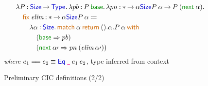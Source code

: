 \documentclass{article}
\newcommand{\meta}[1]{\mathsf{\textcolor{metacolour}{#1}}}
\newcommand{\ind}[1]{\mathsf{\textcolor{indcolour}{#1}}}
\newcommand{\constr}[1]{\mathsf{\textcolor{constrcolour}{#1}}}
\newcommand{\kw}[1]{\mathsf{\textcolor{kwcolour}{#1}}}
\newcommand{\kwopen}[1]{\kw{#1}\:}
\newcommand{\kwbin}[1]{\:\kw{#1}\:}
\newcommand{\pr}[1]{\raisebox{-#1pt}{$^\prime$}}
\newcommand{\alphapr}{\alpha\pr{3}}
\newcommand{\arr}[2]{#1 \mathbin{\rightarrow} #2}
\newcommand{\lam}[3]{\lambda #1 \mathbin{:} #2 \mathpunct{.} #3}
\newcommand{\app}[2]{#1 \: #2}
\newcommand{\Type}[1]{\ind{Type}_{#1}}
\newcommand{\match}[3]{\kwopen{match} #1 \kwbin{return} #2 \kwbin{with} #3}
\newcommand{\fix}[3]{\kwopen{fix} #1 \mathbin{:} #2 \mathbin{\coloneqq} \phantom{} #3}
\newcommand{\Size}{\ind{Size}}
\newcommand{\base}{\constr{base}}
\newcommand{\next}{\constr{next}}
\newcommand{\Eq}{\ind{Eq}}
\newcommand{\eq}[2]{#1 \mathrel{=\joinrel=} #2}
\newcommand{\any}{\meta{\texttt{\_}}}
\begin{document}
\begin{figure}[h]
\begin{align*}
{        }&\quad\lam{P}{\arr{\Size}{\Type{}}}{\lam{pb}{\app{P}{\base}}{\lam{pn}{\arr*{\alpha}{\Size}{\arr{\app{P}{\alpha}}{\app{P}{(\app{\next}{\alpha})}}}}{ \\
        &\qquad\fix{\textit{elim}}{\arr*{\alpha}{\Size}{\app{P}{\alpha}}}{ \\
        &\quad\qquad \lam{\alpha}{\Size}{\match{\alpha}{().\alpha.\app{P}{\alpha}}{ \\
        &\qquad\qquad (\base \Rightarrow pb) \\
        &\qquad\qquad (\app{\next}{\alphapr} \Rightarrow \app{pn}{(\app{\textit{elim}}{\alphapr})})}}}}}}
    \end{align*}
    \textit{where} $\eq{e_1}{e_2} \equiv \app{\app{\app{\Eq}{\any}}{e_1}}{e_2}$, type inferred from context
    \caption{Preliminary CIC definitions (2/2)}
    \label{fig:cic-defs-2}
\end{figure}
\end{document}
